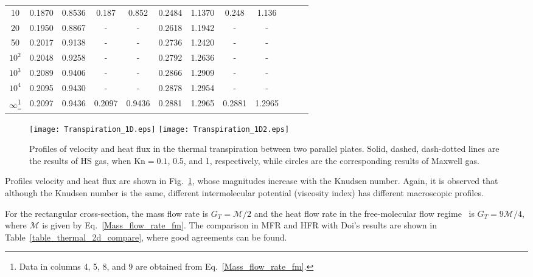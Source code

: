 \begin{table}[t]
\begin{minipage}{14cm}
\begin{tabular}{cccccccccccc}
			10     & 0.1870 & 0.8536  & 0.187  & 0.852   & 0.2484 & 1.1370 & 0.248  & 1.136  \\
			20     & 0.1950 & 0.8867  & -      &-        & 0.2618 & 1.1942 & -      & -      \\
			50     & 0.2017 & 0.9138  & -      &-        & 0.2736 & 1.2420 & -      & -      \\
			$10^2$ & 0.2048 & 0.9258  & -      &-        & 0.2792 & 1.2636 & -      & -      \\
			$10^3$ & 0.2089 & 0.9406  & -      &-        & 0.2866 & 1.2909 & -      & -      \\   
			$10^4$ & 0.2095 & 0.9430  & -      &-        & 0.2878 & 1.2954 & -      & -      \\   
			$\infty$\footnote{Data in columns 4, 5, 8, and 9 are obtained from Eq.~\eqref{Mass_flow_rate_fm}.} & 0.2097 & 0.9436  & 0.2097 & 0.9436  & 0.2881 & 1.2965 & 0.2881 & 1.2965 \\
			\hline
		\end{tabular}\par
		\vspace{-0.75\skip\footins}
		\renewcommand{\footnoterule}{}
	\end{minipage}
\end{table}


\begin{figure}[t]
	\centering
	{\texttt{[image: Transpiration\_1D.eps]}} 	{\texttt{[image: Transpiration\_1D2.eps]}}
	\caption{ Profiles of velocity and heat flux in the thermal transpiration between two parallel plates. Solid, dashed, dash-dotted lines are the results of HS gas, when $\text{Kn}=0.1$, 0.5, and 1, respectively, while circles are the corresponding results of Maxwell gas.   } 
	\label{Transpiration_massheat}
\end{figure}


Profiles velocity and heat flux are shown in Fig.~\ref{Transpiration_massheat}, whose magnitudes increase with the Knudsen number. Again, it is observed that although the Knudsen number is the same, different intermolecular potential (viscosity index) has different macroscopic profiles.



For the rectangular cross-section, the mass flow rate is $G_T=\mathcal{M}/{2}$ and the heat flow rate in the free-molecular flow regime~\cite{loyalka1976} is $G_T={9}\mathcal{M}/4$, where $\mathcal{M}$ is given by Eq.~\eqref{Mass_flow_rate_fm}. The comparison in MFR and HFR with Doi's results are shown in Table~\ref{table_thermal_2d_compare}, where good agreements can be found.



